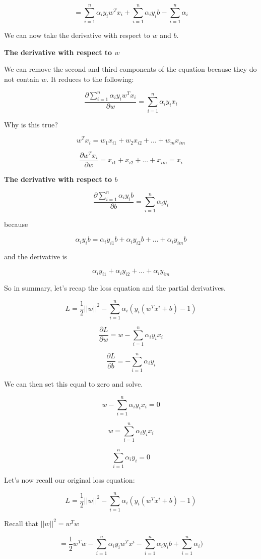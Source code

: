 \[ = \sum_{i=1}^{n} \alpha_i y_i w^T x_i + \sum_{i=1}^{n} \alpha_i y_i b - \sum_{i=1}^{n} \alpha_i \]

We can now take the derivative with respect to \(w\) and \(b\). 

\textbf{The derivative with respect to \(w\)}

We can remove the second and third components of the equation because they do not contain \(w\). It reduces to the following: 

\[ \frac{ \partial \sum_{i=1}^{n} \alpha_i y_i w^Tx_i }{ \partial w } = \sum_{i=1}^{n} \alpha_i y_i x_i \]

Why is this true?

\[w^Tx_i = w_1 x_{i1} + w_2 x_{i2} + ... + w_m x_{im}\]

\[\frac{\partial w^Tx_i}{\partial w}  = x_{i1} + x_{i2} + ... + x_{im}  =  x_i\]

\textbf{The derivative with respect to \(b\)}

\[\frac{\partial \sum_{i=1}^{n} \alpha_i y_i b}{\partial b}  = \sum_{i=1}^{n} \alpha_i y_i \]

because

\[ \alpha_i y_i b = \alpha_i y_{i1} b + \alpha_i y_{i2} b + ... + \alpha_i y_{im} b \]

and the derivative is 

\[\alpha_i y_{i1} + \alpha_i y_{i2} + ... + \alpha_i y_{im} \]

So in summary, let's recap the loss equation and the partial derivatives.


\[ L = \frac{1}{2}||w||^2 - \sum_{i=1}^{n} \alpha_i (y_i ( w^Tx^i + b ) - 1) \]

\[ \frac{\partial L}{\partial w}  = w - \sum_{i=1}^{n} \alpha_i y_i x_i \]

\[ \frac{\partial L}{\partial b}  = - \sum_{i=1}^{n} \alpha_i y_i\]

We can then set this equal to zero and solve.

\[  w - \sum_{i=1}^{n} \alpha_i y_i x_i = 0 \]

\[  w  = \sum_{i=1}^{n} \alpha_i y_i x_i \]

\[ \sum_{i=1}^{n} \alpha_i y_i = 0 \]

Let's now recall our original loss equation: 

\[ L = \frac{1}{2}||w||^2 - \sum_{i=1}^{n} \alpha_i (y_i ( w^Tx^i + b ) - 1) \]

Recall that \(||w||^2 = w^Tw\)


\[ = \frac{1}{2}w^Tw - \sum_{i=1}^{n} \alpha_i y_i w^Tx^i - \sum_{i=1}^{n} \alpha_i y_i b + \sum_{i=1}^{n} \alpha_i ) \]

